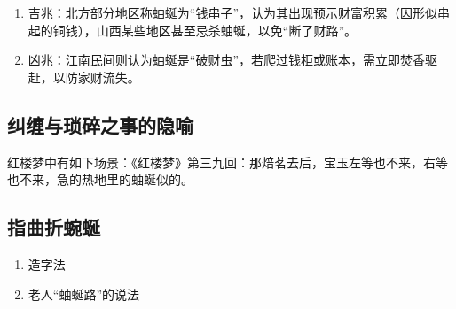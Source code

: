 \begin{enumerate}
    \item 吉兆：北方部分地区称蚰蜒为``钱串子''，认为其出现预示财富积累（因形似串起的铜钱），山西某些地区甚至忌杀蚰蜒，以免``断了财路''。
    \item 凶兆：江南民间则认为蚰蜒是``破财虫''，若爬过钱柜或账本，需立即焚香驱赶，以防家财流失。
\end{enumerate}

\subsection{纠缠与琐碎之事的隐喻}

红楼梦中有如下场景：《红楼梦》第三九回：那焙茗去后，宝玉左等也不来，右等也不来，急的热地里的蚰蜒似的。

\subsection{指曲折蜿蜒}

\begin{enumerate}
    \item 造字法
    \item 老人``蚰蜒路''的说法
\end{enumerate}